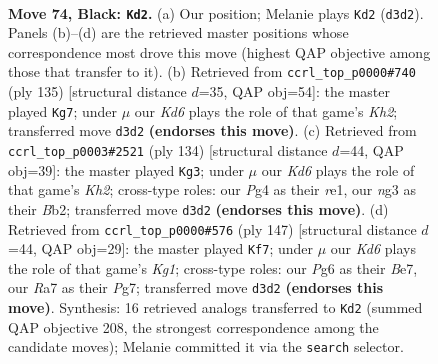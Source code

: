 \documentclass[11pt]{article}
\begin{document}
\clearpage

\begin{figure}[p]\centering
\begin{subfigure}{0.46\textwidth}\centering
\resizebox{\linewidth}{!}{%
\newchessgame
\chessboard[
  setfen={8/r4p2/n5p1/3BP2p/b4Pp1/3k2N1/5K1P/8 b - - 7 74},
  showmover=false,
  pgfstyle=straightmove, color=movearrow, markmove={d3-d2}
]}
\caption{}
\end{subfigure}\hfill
\begin{subfigure}{0.46\textwidth}\centering
\resizebox{\linewidth}{!}{%
\newchessgame
\chessboard[
  setfen={8/5p1k/1p4p1/3B3p/P4N1P/6P1/7K/4r3 b - - 0 68},
  showmover=false,
  pgfstyle=straightmove, color=movearrow, markmove={h7-g7}
]}
\caption{}
\end{subfigure}
\\[4pt]
\begin{subfigure}{0.46\textwidth}\centering
\resizebox{\linewidth}{!}{%
\newchessgame
\chessboard[
  setfen={8/5kp1/p1b2p2/7p/P6P/1P1R1P2/1B4PK/4r3 w - - 0 68},
  showmover=false,
  pgfstyle=straightmove, color=movearrow, markmove={h2-g3}
]}
\caption{}
\end{subfigure}\hfill
\begin{subfigure}{0.46\textwidth}\centering
\resizebox{\linewidth}{!}{%
\newchessgame
\chessboard[
  setfen={6k1/4b1p1/7p/pr2p2P/4N1P1/1P3P2/6K1/R7 b - - 0 74},
  showmover=false,
  pgfstyle=straightmove, color=movearrow, markmove={g8-f7}
]}
\caption{}
\end{subfigure}
\caption{\textbf{Move 74, Black: \texttt{Kd2}.} (a) Our position; Melanie plays \texttt{Kd2} (\texttt{d3d2}). Panels (b)--(d) are the retrieved master positions whose correspondence most drove this move (highest QAP objective among those that transfer to it). (b) Retrieved from \texttt{ccrl\_top\_p0000\#740} (ply 135) [structural distance $d$=35, QAP obj=54]: the master played \texttt{Kg7}; under $\mu$ our \emph{Kd6} plays the role of that game's \emph{Kh2}; transferred move \texttt{d3d2} \textbf{(endorses this move)}. (c) Retrieved from \texttt{ccrl\_top\_p0003\#2521} (ply 134) [structural distance $d$=44, QAP obj=39]: the master played \texttt{Kg3}; under $\mu$ our \emph{Kd6} plays the role of that game's \emph{Kh2}; cross-type roles: our \emph{P}g4 as their \emph{r}e1, our \emph{n}g3 as their \emph{B}b2; transferred move \texttt{d3d2} \textbf{(endorses this move)}. (d) Retrieved from \texttt{ccrl\_top\_p0000\#576} (ply 147) [structural distance $d$=44, QAP obj=29]: the master played \texttt{Kf7}; under $\mu$ our \emph{Kd6} plays the role of that game's \emph{Kg1}; cross-type roles: our \emph{P}g6 as their \emph{B}e7, our \emph{R}a7 as their \emph{P}g7; transferred move \texttt{d3d2} \textbf{(endorses this move)}. Synthesis: 16 retrieved analogs transferred to \texttt{Kd2} (summed QAP objective 208, the strongest correspondence among the candidate moves); Melanie committed it via the \texttt{search} selector.}
\label{fig:thought-m147}
\end{figure}
\end{document}
